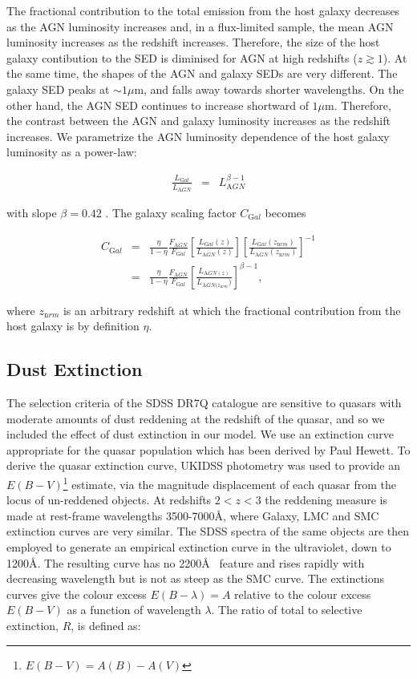 The fractional contribution to the total emission from the host galaxy decreases as the AGN luminosity increases and, in a flux-limited sample, the mean AGN luminosity increases as the redshift increases.
Therefore, the size of the host galaxy contibution to the SED is diminised for AGN at high redshifts ($z\gtrsim1$). 
At the same time, the shapes of the AGN and galaxy SEDs are very different. 
The galaxy SED peaks at $\sim1\mu$m, and falls away towards shorter wavelengths. 
On the other hand, the AGN SED continues to increase shortward of $1\mu$m. 
Therefore, the contrast between the AGN and galaxy luminosity increases as the redshift increases. 
We parametrize the AGN luminosity dependence of the host galaxy luminosity as a power-law:

\begin{eqnarray}
  \label{eq:lgal}
  \frac{L_{\mathrm Gal}}{L_{\mathrm AGN}} &=& L_{\mathrm AGN}^{\beta - 1} 
\end{eqnarray}

with slope $\beta=0.42$ \citep{croom04}. 
The galaxy scaling factor $C_{\mathrm Gal}$ becomes 

\begin{eqnarray}
  C_{\mathrm Gal} &=& \frac{\eta}{1 - \eta} \frac{F_{\mathrm AGN}}{F_{\mathrm Gal}} \left[ \frac{ L_{\mathrm Gal}(z)} {L_{\mathrm AGN}(z)} \right] \left[ \frac{ L_{\mathrm Gal}(z_{\mathrm nrm})} {L_{\mathrm AGN}(z_{\mathrm nrm})} \right]^{-1} \\
  &=& \frac{\eta}{1 - \eta} \frac{F_{\mathrm AGN}}{F_{\mathrm Gal}} \left[ \frac{L_{\mathrm AGN(z)}} {L_{\mathrm AGN(z_{\mathrm nrm}})} \right]^{\beta -1}, 
\end{eqnarray}

where $z_{\mathrm nrm}$ is an arbitrary redshift at which the fractional contribution from the host galaxy is by definition $\eta$. 

\subsection{Dust Extinction}
\label{sec:sed-extinction} 

The selection criteria of the SDSS DR7Q catalogue are sensitive to quasars with moderate amounts of dust reddening at the redshift of the quasar, and so we included the effect of dust extinction in our model. 
We use an extinction curve appropriate for the quasar population which has been derived by Paul Hewett. 
To derive the quasar extinction curve, UKIDSS photometry was used to provide an $E(B-V)$\footnote{$E(B-V)=A(B)-A(V)$} estimate, via the magnitude displacement of each quasar from the locus of un-reddened objects. 
At redshifts $2 < z < 3$ the reddening measure is made at rest-frame wavelengths 3500-7000\AA, where Galaxy, LMC and SMC extinction curves are very similar. 
The SDSS spectra of the same objects are then employed to generate an empirical extinction curve in the ultraviolet, down to 1200\AA. 
The resulting curve has no 2200\AA~ feature and rises rapidly with decreasing wavelength but is not as steep as the SMC curve. 
The extinctions curves give the colour excess $E(B-\lambda) = A$ relative to the colour excess $E(B-V)$ as a function of wavelength $\lambda$. 
The ratio of total to selective extinction, $R$, is defined as: 

